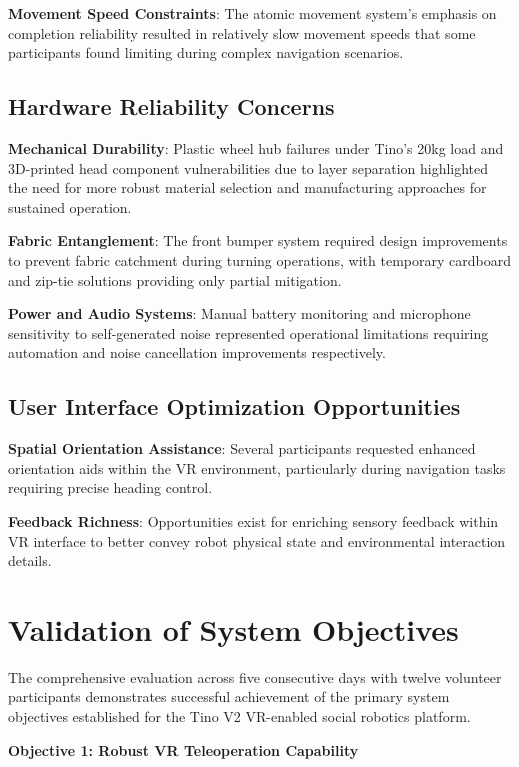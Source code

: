 \textbf{Movement Speed Constraints}: The atomic movement system's emphasis on completion reliability resulted in relatively slow movement speeds that some participants found limiting during complex navigation scenarios.


\subsection{Hardware Reliability Concerns}

\textbf{Mechanical Durability}: Plastic wheel hub failures under Tino's 20kg load and 3D-printed head component vulnerabilities due to layer separation highlighted the need for more robust material selection and manufacturing approaches for sustained operation.

\textbf{Fabric Entanglement}: The front bumper system required design improvements to prevent fabric catchment during turning operations, with temporary cardboard and zip-tie solutions providing only partial mitigation.

\textbf{Power and Audio Systems}: Manual battery monitoring and microphone sensitivity to self-generated noise represented operational limitations requiring automation and noise cancellation improvements respectively.

\subsection{User Interface Optimization Opportunities}

\textbf{Spatial Orientation Assistance}: Several participants requested enhanced orientation aids within the VR environment, particularly during navigation tasks requiring precise heading control.

\textbf{Feedback Richness}: Opportunities exist for enriching sensory feedback within VR interface to better convey robot physical state and environmental interaction details.

\section{Validation of System Objectives}
\label{sec:objective_validation}

The comprehensive evaluation across five consecutive days with twelve volunteer participants demonstrates successful achievement of the primary system objectives established for the Tino V2 VR-enabled social robotics platform.

\textbf{Objective 1: Robust VR Teleoperation Capability}

